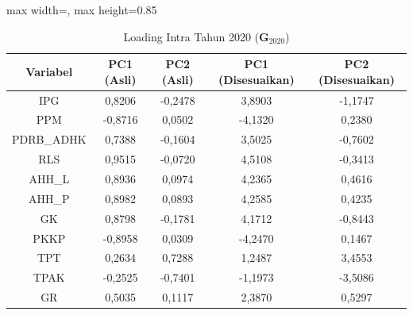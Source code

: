 \begin{table}[H]
\centering
\caption{Loading Intra Tahun 2020 ($\mathbf{G}_{2020}$)} \label{tab:app1loading_intra_2020}
\begin{adjustbox}{max width=\textwidth, max height=0.85\textheight}
\begin{tabular}{|c|c|c|c|c|}
\hline
\textbf{Variabel} & \textbf{PC1 (Asli)} & \textbf{PC2 (Asli)} & \textbf{PC1 (Disesuaikan)} & \textbf{PC2 (Disesuaikan)} \\
\hline
IPG & 0,8206 & -0,2478 & 3,8903 & -1,1747 \\
PPM & -0,8716 & 0,0502 & -4,1320 & 0,2380 \\
PDRB\_ADHK & 0,7388 & -0,1604 & 3,5025 & -0,7602 \\
RLS & 0,9515 & -0,0720 & 4,5108 & -0,3413 \\
AHH\_L & 0,8936 & 0,0974 & 4,2365 & 0,4616 \\
AHH\_P & 0,8982 & 0,0893 & 4,2585 & 0,4235 \\
GK & 0,8798 & -0,1781 & 4,1712 & -0,8443 \\
PKKP & -0,8958 & 0,0309 & -4,2470 & 0,1467 \\
TPT & 0,2634 & 0,7288 & 1,2487 & 3,4553 \\
TPAK & -0,2525 & -0,7401 & -1,1973 & -3,5086 \\
GR & 0,5035 & 0,1117 & 2,3870 & 0,5297 \\
\hline
\end{tabular}
\end{adjustbox}
\end{table}